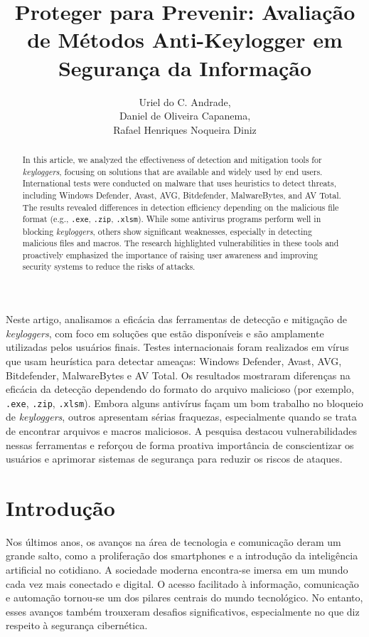 \documentclass[12pt]{article}
\title{Proteger para Prevenir: Avaliação de Métodos Anti-Keylogger em Segurança da Informação\\ }
\author{Uriel do C. Andrade\inst{1},\\
Daniel de Oliveira Capanema\inst{1}, \\
Rafael Henriques Noqueira Diniz\inst{1}}
\begin{document}
\maketitle
\begin{abstract}
    In this article, we analyzed the effectiveness of detection and mitigation tools for \textit{keyloggers}, focusing on solutions that are available and widely used by end users. International tests were conducted on malware that uses heuristics to detect threats, including Windows Defender, Avast, AVG, Bitdefender, MalwareBytes, and AV Total. The results revealed differences in detection efficiency depending on the malicious file format (e.g., \texttt{.exe}, \texttt{.zip}, \texttt{.xlsm}). While some antivirus programs perform well in blocking \textit{keyloggers}, others show significant weaknesses, especially in detecting malicious files and macros. The research highlighted vulnerabilities in these tools and proactively emphasized the importance of raising user awareness and improving security systems to reduce the risks of attacks.
\end{abstract}

\begin{resumo}
    Neste artigo, analisamos a eficácia das ferramentas de detecção e mitigação de \textit{keyloggers}, com foco em soluções que estão disponíveis e são amplamente utilizadas pelos usuários finais. Testes internacionais foram realizados em vírus que usam heurística para detectar ameaças: Windows Defender, Avast, AVG, Bitdefender, MalwareBytes e AV Total. Os resultados mostraram diferenças na eficácia da detecção dependendo do formato do arquivo malicioso (por exemplo, \texttt{.exe}, \texttt{.zip}, \texttt{.xlsm}). Embora alguns antivírus façam um bom trabalho no bloqueio de \textit{keyloggers}, outros apresentam sérias fraquezas, especialmente quando se trata de encontrar arquivos e macros maliciosos.  A pesquisa destacou vulnerabilidades nessas ferramentas e reforçou de forma proativa importância de conscientizar os usuários e aprimorar sistemas de segurança para reduzir os riscos de ataques.\end{resumo}
\section{Introdução}

Nos últimos anos, os avanços na área de tecnologia e comunicação deram um grande salto, como a proliferação dos smartphones e a introdução da inteligência artificial no cotidiano. A sociedade moderna encontra-se imersa em um mundo cada vez mais conectado e digital. O acesso facilitado à informação, comunicação e automação tornou-se um dos pilares centrais do mundo tecnológico. No entanto, esses avanços também trouxeram desafios significativos, especialmente no que diz respeito à segurança cibernética.
\end{document}

